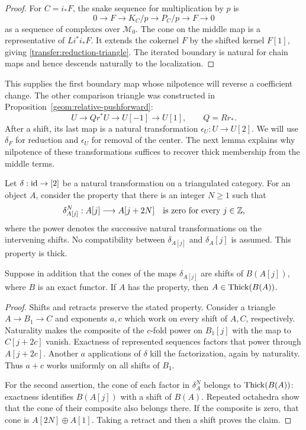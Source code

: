 \begin{proof}
For $C=i_*F$, the snake sequence for multiplication by $p$ is
\[
 0\longrightarrow F\longrightarrow K_C/p
  \longrightarrow P_C/p\longrightarrow F\longrightarrow0
\]
as a sequence of complexes over $\mathcal M_0$. The cone on the
middle map is a representative of $Li^*i_*F$. It extends the
cokernel $F$ by the shifted kernel $F[1]$, giving
\eqref{transfer:reduction-triangle}. The iterated boundary is natural
for chain maps and hence descends naturally to the localization.
\end{proof}

This supplies the first boundary map whose nilpotence will reverse a
coefficient change. The other comparison triangle was constructed in
Proposition~\ref{geom:relative-pushforward}:
\begin{equation}
 U\longrightarrow Qr^*U\longrightarrow U[-1]
       \longrightarrow U[1],\qquad Q=Rr_*.
 \label{transfer:center-triangle}
\end{equation}
After a shift, its last map is a natural transformation
$\epsilon_U:U\to U[2]$. We will use $\delta_F$ for reduction and
$\epsilon_U$ for removal of the center. The next lemma explains why
nilpotence of these transformations suffices to recover thick
membership from the middle terms.

\begin{lemma}
\label{transfer:nilpotence}
Let $\delta:\operatorname{id}\to[2]$ be a natural transformation on a triangulated
category. For an object $A$, consider the property that there is an
integer $N\geq1$ such that
\[
 \delta_{A[j]}^N:A[j]\longrightarrow A[j+2N]
 \quad\text{is zero for every }j\in\mathbb Z,
\]
where the power denotes the successive natural transformations on
the intervening shifts. No compatibility between $\delta_{A[j]}$ and
$\delta_A[j]$ is assumed. This property is thick.

Suppose in addition that the cones of the maps $\delta_{A[j]}$ are
shifts of $B(A[j])$, where $B$ is an exact functor. If $A$ has the
property, then $A\in\operatorname{Thick}(B(A))$.
\end{lemma}

\begin{proof}
Shifts and retracts preserve the stated property. Consider a triangle
$A\to B_1\to C$ and exponents $a,c$ which work on every shift
of $A,C$, respectively. Naturality makes the composite of the
$c$-fold power on $B_1[j]$ with the map to $C[j+2c]$ vanish.
Exactness of represented sequences factors that power through
$A[j+2c]$. Another $a$ applications of $\delta$ kill the
factorization, again by naturality. Thus $a+c$ works uniformly
on all shifts of $B_1$.

For the second assertion, the cone of each factor in
$\delta_A^N$ belongs to $\operatorname{Thick}(B(A))$: exactness identifies
$B(A[j])$ with a shift of $B(A)$. Repeated octahedra show that
the cone of their composite also belongs there. If the composite
is zero, that cone is $A[2N]\oplus A[1]$. Taking a retract and
then a shift proves the claim.
\end{proof}


